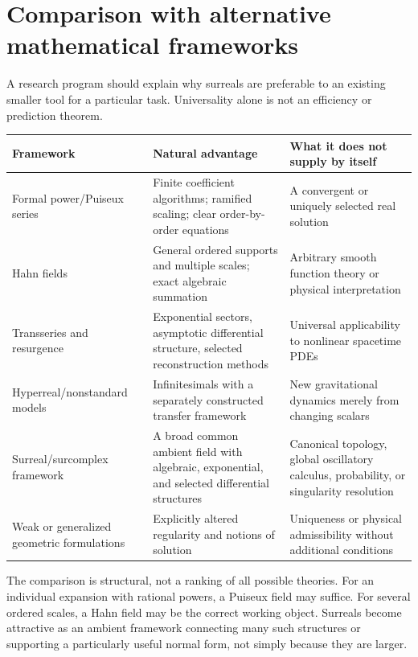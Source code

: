 \documentclass[11pt,letterpaper]{article}
\theoremstyle{definition}
\theoremstyle{remark}
\begin{document}
\section{Comparison with alternative mathematical frameworks}
\label{sec:comparison}

A research program should explain why surreals are preferable to an existing
smaller tool for a particular task. Universality alone is not an efficiency or
prediction theorem.

\begin{center}
\small
\begin{tabular}{@{}P{0.22\textwidth}P{0.32\textwidth}P{0.35\textwidth}@{}}
\toprule
Framework & Natural advantage & What it does not supply by itself \\
\midrule
Formal power/Puiseux series & Finite coefficient algorithms; ramified scaling;
clear order-by-order equations & A convergent or uniquely selected real solution \\
Hahn fields & General ordered supports and multiple scales; exact algebraic
summation & Arbitrary smooth function theory or physical interpretation \\
Transseries and resurgence & Exponential sectors, asymptotic differential
structure, selected reconstruction methods & Universal applicability to nonlinear
spacetime PDEs \\
Hyperreal/nonstandard models & Infinitesimals with a separately constructed
transfer framework & New gravitational dynamics merely from changing scalars \\
Surreal/surcomplex framework & A broad common ambient field with algebraic,
exponential, and selected differential structures & Canonical topology, global
oscillatory calculus, probability, or singularity resolution \\
Weak or generalized geometric formulations & Explicitly altered regularity and
notions of solution & Uniqueness or physical admissibility without additional
conditions \\
\bottomrule
\end{tabular}
\end{center}

The comparison is structural, not a ranking of all possible theories. For an
individual expansion with rational powers, a Puiseux field may suffice. For
several ordered scales, a Hahn field may be the correct working object.
Surreals become attractive as an ambient framework connecting many such
structures or supporting a particularly useful normal form, not simply because
they are larger.
\end{document}
